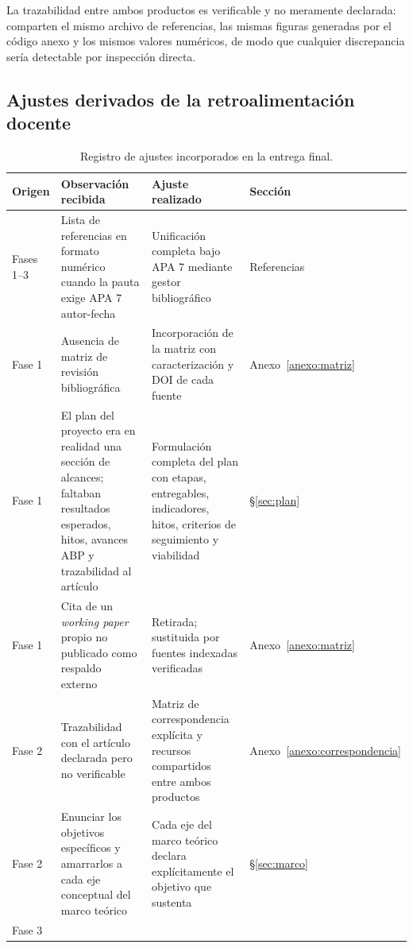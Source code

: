 La trazabilidad entre ambos productos es verificable y no meramente declarada:
comparten el mismo archivo de referencias, las mismas figuras generadas por el
código anexo y los mismos valores numéricos, de modo que cualquier discrepancia
sería detectable por inspección directa.

\subsection{Ajustes derivados de la retroalimentación docente}
\label{anexo:ajustes}

\begin{table}[H]
\centering
\caption{Registro de ajustes incorporados en la entrega final.}
\label{tab:ajustes}
\footnotesize
\begin{tabular}{@{}p{1.8cm}p{4.6cm}p{4.6cm}p{2.4cm}@{}}
\toprule
\textbf{Origen} & \textbf{Observación recibida} & \textbf{Ajuste realizado} &
\textbf{Sección}\\
\midrule
Fases 1--3 &
Lista de referencias en formato numérico cuando la pauta exige APA 7
autor-fecha &
Unificación completa bajo APA 7 mediante gestor bibliográfico &
Referencias\\
\addlinespace
Fase 1 &
Ausencia de matriz de revisión bibliográfica &
Incorporación de la matriz con caracterización y DOI de cada fuente &
Anexo~\ref{anexo:matriz}\\
\addlinespace
Fase 1 &
El plan del proyecto era en realidad una sección de alcances; faltaban
resultados esperados, hitos, avances ABP y trazabilidad al artículo &
Formulación completa del plan con etapas, entregables, indicadores, hitos,
criterios de seguimiento y viabilidad &
\S\ref{sec:plan}\\
\addlinespace
Fase 1 &
Cita de un \emph{working paper} propio no publicado como respaldo externo &
Retirada; sustituida por fuentes indexadas verificadas &
Anexo~\ref{anexo:matriz}\\
\addlinespace
Fase 2 &
Trazabilidad con el artículo declarada pero no verificable &
Matriz de correspondencia explícita y recursos compartidos entre ambos
productos &
Anexo~\ref{anexo:correspondencia}\\
\addlinespace
Fase 2 &
Enunciar los objetivos específicos y amarrarlos a cada eje conceptual del marco
teórico &
Cada eje del marco teórico declara explícitamente el objetivo que sustenta &
\S\ref{sec:marco}\\
\addlinespace
Fase 3 &

\end{tabular}
\end{table}
